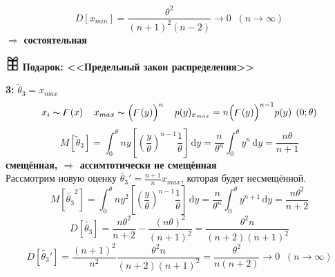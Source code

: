 \begin{equation*}
    D\left[x_{min} \right] = \frac{\theta^2}{(n+1)^2(n-2)} \to 0 \;\; (n\to\infty)
\end{equation*}
$\Rightarrow$ \textbf{состоятельная} \\
\vspace{2.5mm}
\begin{flushleft}
    \includegraphics[width=0.04\textwidth]{images/present.png} 
    \textbf{Подарок: <<Предельный закон распределения>>}
\end{flushleft}
\vspace{2.5mm}

\textbf{3:} 
$\tilde\theta_3 = x_{max}$
\begin{equation*}
    x_i\thicksim\digamma(x) \hspace{4mm} x_{max} \thicksim \Big(\digamma(y)\Big)^n \hspace{4mm} 
    p(y)_{x_{max}} = n\Big(\digamma(y)\Big)^{n-1}p(y)\;\left(0;\theta\right)
\end{equation*}
\begin{equation*}
    M\left[\tilde\theta_3\right] = \int_{0}^{\theta}ny\left[\left(\frac{y}{\theta}\right)^{n-1}\frac{1}{\theta}\right]\,\mathrm{d}y
    = \frac{n}{\theta^{n}}\int_{0}^{\theta}y^n\,\mathrm{d}y
    = \frac{n\theta}{n+1}
\end{equation*}
 \textbf{смещённая, $\Rightarrow$ ассимтотически не смещённая}\\
Рассмотрим новую оценку $\tilde{\theta_3}' = \frac{n+1}{n}x_{max}$, которая будет несмещённой.\\
\begin{equation*}
    M\left[\tilde{\theta_3}^2\right] = \int_{0}^{\theta}ny^2\left[\left(\frac{y}{\theta}\right)^{n-1}\frac{1}{\theta}\right]\,\mathrm{d}y
    = \frac{n}{\theta^{n}}\int_{0}^{\theta}y^{n+1}\,\mathrm{d}y
    = \frac{n\theta^2}{n+2}
\end{equation*}
\vspace{2.5mm}
\begin{equation*}
    D\left[\tilde{\theta_3}\right] = \frac{n\theta^2}{n+2} - \frac{(n\theta)^2}{(n+1)^2} = \frac{\theta^2n}{(n+2)(n+1)^2}
\end{equation*}
\vspace{1.5mm}
\begin{equation*}
    D\left[\tilde{\theta_3}'\right] = \frac{(n+1)^2}{n^2}\frac{\theta^2n}{(n+2)(n+1)^2}
    = \frac{\theta^2}{n(n+2)} \to 0 \;\; (n \to \infty)
\end{equation*}\\
